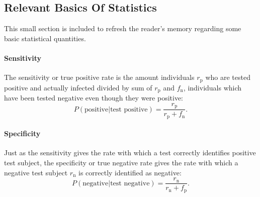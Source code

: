 \subsection{Relevant Basics Of Statistics}
This small section is included to refresh the reader's memory regarding some basic statistical quantities. 
\paragraph{Sensitivity}
The sensitivity or true positive rate is the amount individuals $r_\text{p}$ who are tested positive and actually infected divided by sum of $r_\text{p}$ and $f_\text{n}$, individuals which have been tested negative even though they were positive:
\begin{equation}
P(\text{positive} | \text{test positive}) = \frac{r_\text{p}}{r_\text{p} + f_\text{n}}.
\end{equation}

\paragraph{Specificity}
Just as the sensitivity gives the rate with which a test correctly identifies positive test subject, the specificity or true negative rate gives the rate with which a negative test subject $r_\text{n}$ is correctly identified as negative:
\begin{equation}
P(\text{negative} | \text{test negative}) = \frac{r_\text{n}}{r_\text{n} + f_\text{p}}.
\end{equation}